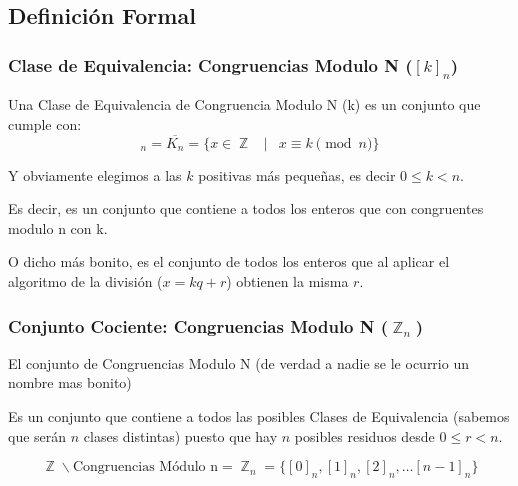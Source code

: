 \documentclass[12pt, fleqn]{report}                             %
\DeclareMathOperator \Space {\quad}                             %
\DeclareMathOperator \MiniSpace {\;}                            %
\newcommand \Such {\MiniSpace|\MiniSpace}                       %
\DeclareMathOperator \Integers  {\mathbb{Z}}                     %
\begin{document}
        \subsection*{Definición Formal}

            \subsubsection*{Clase de Equivalencia: Congruencias Modulo N ($[k]_n$)}

                Una Clase de Equivalencia de Congruencia Modulo N (k) es un conjunto
                que cumple con:
                \begin{equation}
                    [k]_n = \overline{K_n} = \{ x \in \Integers \Such x \equiv k \pmod{n} \}
                \end{equation}

                Y obviamente elegimos a las $k$ positivas más pequeñas, es decir 
                $0 \leq k < n$.

                Es decir, es un conjunto que contiene a todos los enteros que con
                congruentes modulo n con k.

                O dicho más bonito, es el conjunto de todos los enteros que al aplicar
                el algoritmo de la división ($x = kq+r$) obtienen la misma $r$.\\

            \subsubsection*{Conjunto Cociente: Congruencias Modulo N ($\Integers_n$)}

                El conjunto de Congruencias Modulo N (de verdad a nadie se le ocurrio 
                un nombre mas bonito)  

                Es  un conjunto que contiene a todos las posibles Clases de Equivalencia
                (sabemos que serán $n$ clases distintas) puesto que hay $n$ posibles residuos
                desde $0 \leq r < n$.

                \begin{equation}
                    \Integers \backslash \text{Congruencias Módulo n} = 
                        \Integers_n = \{ [0]_n , [1]_n, [2]_n, \dots  [n-1]_n\}
                \end{equation}



        \clearpage
\end{document}
